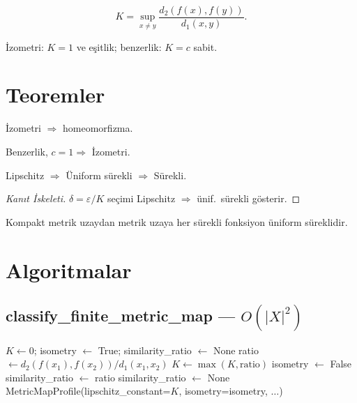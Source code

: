 \[
K = \sup_{x \neq y} \frac{d_2(f(x),f(y))}{d_1(x,y)}.
\]

İzometri: $K=1$ ve eşitlik; benzerlik: $K=c$ sabit.

\section{Teoremler}

\begin{theorem}
İzometri $\Rightarrow$ homeomorfizma.
\end{theorem}

\begin{theorem}
Benzerlik, $c=1 \Rightarrow$ İzometri.
\end{theorem}

\begin{theorem}
Lipschitz $\Rightarrow$ Üniform sürekli $\Rightarrow$ Sürekli.
\begin{proof}[Kanıt İskeleti]
$\delta = \varepsilon / K$ seçimi Lipschitz $\Rightarrow$ ünif.\ sürekli gösterir.
\end{proof}
\end{theorem}

\begin{theorem}
Kompakt metrik uzaydan metrik uzaya her sürekli fonksiyon üniform süreklidir.
\end{theorem}

\section{Algoritmalar}

\subsection{classify\_finite\_metric\_map — $O(|X|^2)$}

\begin{algorithm}
\caption{ClassifyMap$(X, d_1, Y, d_2, f)$}
\begin{algorithmic}[1]
\State $K \leftarrow 0$; isometry $\leftarrow$ True; similarity\_ratio $\leftarrow$ None
    \State ratio $\leftarrow d_2(f(x_1),f(x_2)) / d_1(x_1,x_2)$
    \State $K \leftarrow \max(K, \text{ratio})$
        \State isometry $\leftarrow$ False
    \EndIf
        \State similarity\_ratio $\leftarrow$ ratio
        \State similarity\_ratio $\leftarrow$ None
    \EndIf
\EndFor
\State \Return MetricMapProfile(lipschitz\_constant=$K$, isometry=isometry, $\ldots$)
\end{algorithmic}
\end{algorithm}

